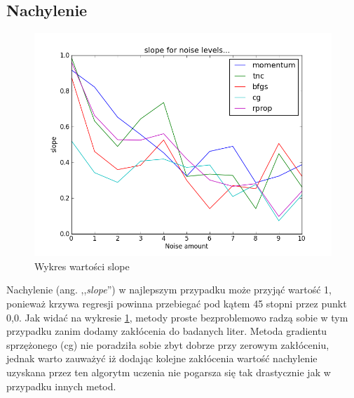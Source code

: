 \documentclass[a4paper]{article}
\begin{document}
\subsection{Nachylenie}
\begin{figure}[pht]
 \centering
 \includegraphics[scale=0.5]{../compare_plots/compare_plot_slope}
 \caption{Wykres wartości slope}\label{rys:plot1}
\end{figure}
Nachylenie (ang. ,,\textit{slope}'') w najlepszym przypadku może przyjąć wartość 1, ponieważ krzywa regresji 
powinna przebiegać pod kątem 45 stopni przez punkt 0,0. Jak widać na wykresie \ref{rys:plot1},
metody proste bezproblemowo radzą sobie w tym przypadku zanim dodamy zakłócenia do badanych liter.
Metoda gradientu sprzężonego (cg) nie poradziła sobie zbyt dobrze przy zerowym
zakłóceniu, jednak warto 
zauważyć iż dodając kolejne zakłócenia wartość nachylenie uzyskana przez ten algorytm uczenia nie pogarsza się tak drastycznie 
jak w przypadku innych metod.
\end{document}
